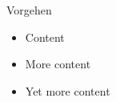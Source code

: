 \begin{frame}{Vorgehen}
    \begin{itemize}[<+->]
      \item Content
      \item More content
      \item Yet more content
    \end{itemize}
\end{frame} 